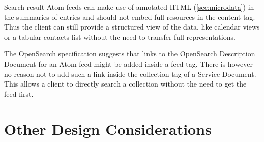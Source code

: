 \documentclass[12pt,a4paper,twoside]{scrartcl}		%
\begin{document}
Search result Atom feeds can make use of annotated HTML
(\autoref{sec:microdata}) in the summaries of entries and should not embed full
resources in the content tag. Thus the client can still provide a structured
view of the data, like calendar views or a tabular contacts list without the
need to transfer full representations.

The OpenSearch specification suggests that links to the OpenSearch Description
Document for an Atom feed might be added inside a feed tag. There is however no
reason not to add such a link inside the collection tag of a Service
Document. This allows a client to directly search a collection without the need
to get the feed first.




\section{Other Design Considerations}
\label{sec:design}




\end{document}

